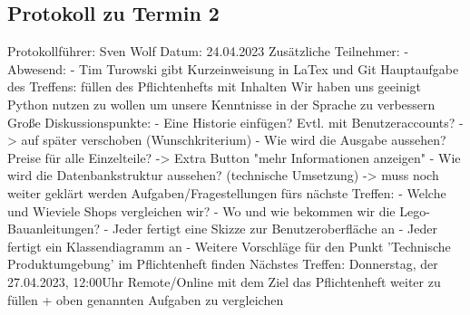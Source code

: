 \subsection{Protokoll zu Termin 2}
Protokollführer: Sven Wolf \newline
Datum: 24.04.2023 \newline
Zusätzliche Teilnehmer: - \newline
Abwesend: - \newline \newline
Tim Turowski gibt Kurzeinweisung in LaTex und Git \newline
Hauptaufgabe des Treffens: füllen des Pflichtenhefts mit Inhalten \newline
Wir haben uns geeinigt Python nutzen zu wollen um unsere Kenntnisse in der Sprache zu verbessern \newline
Große Diskussionspunkte: \newline
- Eine Historie einfügen? Evtl. mit Benutzeraccounts? -> auf später verschoben (Wunschkriterium) \newline
- Wie wird die Ausgabe aussehen? Preise für alle Einzelteile? -> Extra Button "mehr Informationen anzeigen" \newline
- Wie wird die Datenbankstruktur aussehen? (technische Umsetzung) -> muss noch weiter geklärt werden \newline
Aufgaben/Fragestellungen fürs nächste Treffen: \newline
- Welche und Wieviele Shops vergleichen wir? \newline
- Wo und wie bekommen wir die Lego-Bauanleitungen? \newline
- Jeder fertigt eine Skizze zur Benutzeroberfläche an \newline
- Jeder fertigt ein Klassendiagramm an \newline
- Weitere Vorschläge für den Punkt 'Technische Produktumgebung' im Pflichtenheft finden \newline
Nächstes Treffen: Donnerstag, der 27.04.2023, 12:00Uhr Remote/Online mit dem Ziel das Pflichtenheft weiter zu füllen + oben genannten Aufgaben zu vergleichen

